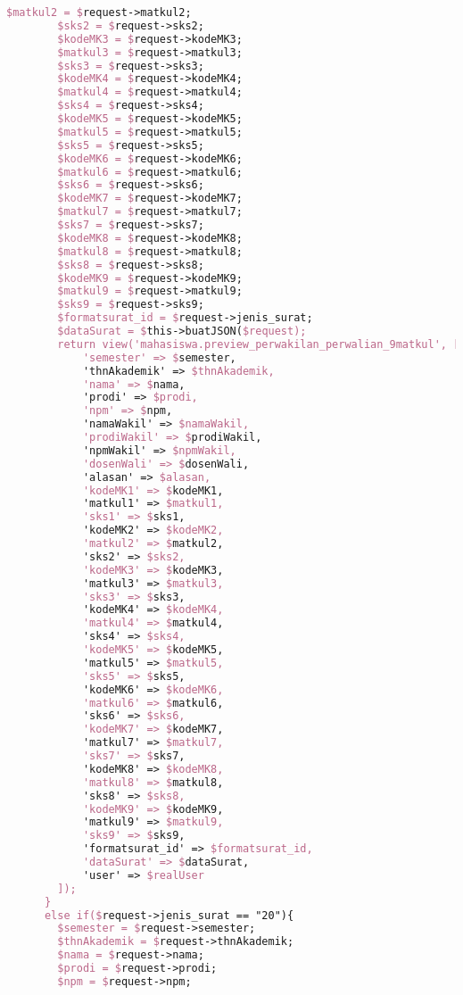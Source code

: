 \begin{lstlisting}[language=tex,basicstyle=\tiny,caption=PesanansuratController.php]
        $matkul2 = $request->matkul2;
        $sks2 = $request->sks2;
        $kodeMK3 = $request->kodeMK3;
        $matkul3 = $request->matkul3;
        $sks3 = $request->sks3;
        $kodeMK4 = $request->kodeMK4;
        $matkul4 = $request->matkul4;
        $sks4 = $request->sks4;
        $kodeMK5 = $request->kodeMK5;
        $matkul5 = $request->matkul5;
        $sks5 = $request->sks5;
        $kodeMK6 = $request->kodeMK6;
        $matkul6 = $request->matkul6;
        $sks6 = $request->sks6;
        $kodeMK7 = $request->kodeMK7;
        $matkul7 = $request->matkul7;
        $sks7 = $request->sks7;
        $kodeMK8 = $request->kodeMK8;
        $matkul8 = $request->matkul8;
        $sks8 = $request->sks8;
        $kodeMK9 = $request->kodeMK9;
        $matkul9 = $request->matkul9;
        $sks9 = $request->sks9;
        $formatsurat_id = $request->jenis_surat;
        $dataSurat = $this->buatJSON($request);
        return view('mahasiswa.preview_perwakilan_perwalian_9matkul', [
            'semester' => $semester,
            'thnAkademik' => $thnAkademik,
            'nama' => $nama,
            'prodi' => $prodi,
            'npm' => $npm,
            'namaWakil' => $namaWakil,
            'prodiWakil' => $prodiWakil,
            'npmWakil' => $npmWakil,
            'dosenWali' => $dosenWali,
            'alasan' => $alasan,
            'kodeMK1' => $kodeMK1,
            'matkul1' => $matkul1,
            'sks1' => $sks1,
            'kodeMK2' => $kodeMK2,
            'matkul2' => $matkul2,
            'sks2' => $sks2,
            'kodeMK3' => $kodeMK3,
            'matkul3' => $matkul3,
            'sks3' => $sks3,
            'kodeMK4' => $kodeMK4,
            'matkul4' => $matkul4,
            'sks4' => $sks4,
            'kodeMK5' => $kodeMK5,
            'matkul5' => $matkul5,
            'sks5' => $sks5,
            'kodeMK6' => $kodeMK6,
            'matkul6' => $matkul6,
            'sks6' => $sks6,
            'kodeMK7' => $kodeMK7,
            'matkul7' => $matkul7,
            'sks7' => $sks7,
            'kodeMK8' => $kodeMK8,
            'matkul8' => $matkul8,
            'sks8' => $sks8,
            'kodeMK9' => $kodeMK9,
            'matkul9' => $matkul9,
            'sks9' => $sks9,
            'formatsurat_id' => $formatsurat_id,
            'dataSurat' => $dataSurat,
            'user' => $realUser
        ]);
      }
      else if($request->jenis_surat == "20"){
        $semester = $request->semester;
        $thnAkademik = $request->thnAkademik;
        $nama = $request->nama;
        $prodi = $request->prodi;
        $npm = $request->npm;

\end{lstlisting}
